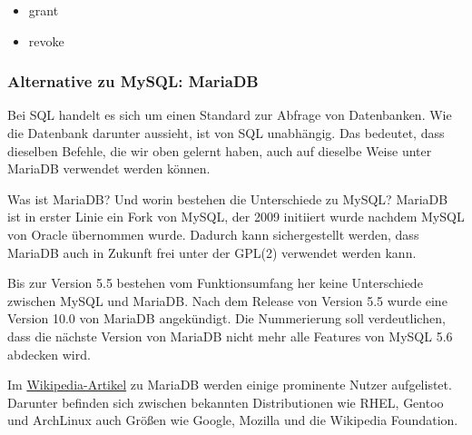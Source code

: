 	\begin{itemize}
		\item grant
		\item revoke
	\end{itemize}

\subsubsection{Alternative zu MySQL: MariaDB}

Bei SQL handelt es sich um einen Standard zur Abfrage von Datenbanken. Wie die Datenbank darunter aussieht, ist von SQL unabhängig. Das bedeutet, dass dieselben Befehle, die wir oben gelernt haben, auch auf dieselbe Weise unter MariaDB verwendet werden können.

Was ist MariaDB? Und worin bestehen die Unterschiede zu MySQL? MariaDB ist in erster Linie ein Fork von MySQL, der 2009 initiiert wurde nachdem MySQL von Oracle übernommen wurde. Dadurch kann sichergestellt werden, dass MariaDB auch in Zukunft frei unter der GPL(2) verwendet werden kann.

Bis zur Version 5.5 bestehen vom Funktionsumfang her keine Unterschiede zwischen MySQL und MariaDB. Nach dem Release von Version 5.5 wurde eine Version 10.0 von MariaDB angekündigt. Die Nummerierung soll verdeutlichen, dass die nächste Version von MariaDB nicht mehr alle Features von MySQL 5.6 abdecken wird.

Im \href{http://en.wikipedia.org/wiki/MariaDB}{Wikipedia-Artikel} zu MariaDB werden einige prominente Nutzer aufgelistet. Darunter befinden sich zwischen bekannten Distributionen wie RHEL, Gentoo und ArchLinux auch Größen wie Google, Mozilla und die Wikipedia Foundation.

